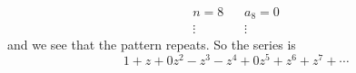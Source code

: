\documentclass{article}
\begin{document}
\begin{itemize}
\begin{answer}
\begin{align*}
                        n = 8  &\hspace{10pt} a_{8} = 0  \\
                        \vdots &\hspace{10pt} \vdots       
                    \end{align*}
                and we see that the pattern repeats. So the series is 
                    \begin{equation*}
                        1 + z + 0z^{2} - z^{3} - z^{4} + 0z^{5} + z^{6} + z^{7} + \cdots
                    \end{equation*}
            \end{answer}
    \end{itemize}
\end{document}
